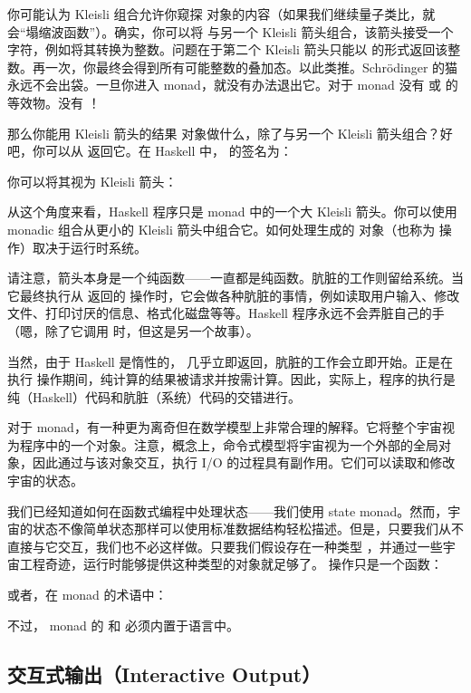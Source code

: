 你可能认为 Kleisli 组合允许你窥探  对象的内容（如果我们继续量子类比，就会“塌缩波函数”）。确实，你可以将  与另一个 Kleisli 箭头组合，该箭头接受一个字符，例如将其转换为整数。问题在于第二个 Kleisli 箭头只能以  的形式返回该整数。再一次，你最终会得到所有可能整数的叠加态。以此类推。Schrödinger 的猫永远不会出袋。一旦你进入  monad，就没有办法退出它。对于  monad 没有  或  的等效物。没有 ！

那么你能用 Kleisli 箭头的结果  对象做什么，除了与另一个 Kleisli 箭头组合？好吧，你可以从  返回它。在 Haskell 中， 的签名为：

你可以将其视为 Kleisli 箭头：

从这个角度来看，Haskell 程序只是  monad 中的一个大 Kleisli 箭头。你可以使用 monadic 组合从更小的 Kleisli 箭头中组合它。如何处理生成的  对象（也称为  操作）取决于运行时系统。

请注意，箭头本身是一个纯函数——一直都是纯函数。肮脏的工作则留给系统。当它最终执行从  返回的  操作时，它会做各种肮脏的事情，例如读取用户输入、修改文件、打印讨厌的信息、格式化磁盘等等。Haskell 程序永远不会弄脏自己的手（嗯，除了它调用  时，但这是另一个故事）。

当然，由于 Haskell 是惰性的， 几乎立即返回，肮脏的工作会立即开始。正是在执行  操作期间，纯计算的结果被请求并按需计算。因此，实际上，程序的执行是纯（Haskell）代码和肮脏（系统）代码的交错进行。

对于  monad，有一种更为离奇但在数学模型上非常合理的解释。它将整个宇宙视为程序中的一个对象。注意，概念上，命令式模型将宇宙视为一个外部的全局对象，因此通过与该对象交互，执行 I/O 的过程具有副作用。它们可以读取和修改宇宙的状态。

我们已经知道如何在函数式编程中处理状态——我们使用 state monad。然而，宇宙的状态不像简单状态那样可以使用标准数据结构轻松描述。但是，只要我们从不直接与它交互，我们也不必这样做。只要我们假设存在一种类型 ，并通过一些宇宙工程奇迹，运行时能够提供这种类型的对象就足够了。 操作只是一个函数：

或者，在  monad 的术语中：

不过， monad 的 \code{>=>} 和  必须内置于语言中。

\subsection{交互式输出（Interactive Output）}

